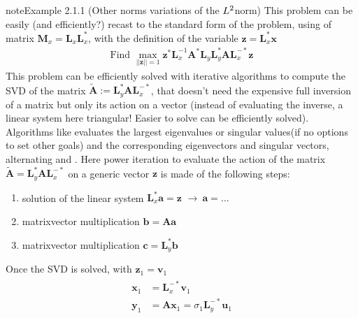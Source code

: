 \documentclass[letterpaper,10pt,english]{jupyterBook}
\begin{document}
\begin{sphinxadmonition}{note}{Example 2.1.1 (Other norms \sphinxhyphen{} variations of the \protect\(L^2\protect\)\sphinxhyphen{}norm)}
\sphinxAtStartPar
This problem can be easily (and efficiently?) recast to the standard form of the problem, using {\hyperref[\detokenize{ch/linear-algebra/matrix-factorization:math-matrix-factorization}]{}} of matrix \(\mathbf{M}_x = \mathbf{L}_x \mathbf{L}_x^*\), with the definition of the variable \(\mathbf{z} = \mathbf{L}_x^* \mathbf{x}\)
\begin{equation*}
\begin{split}\text{Find } \max_{||\mathbf{z}||=1} \mathbf{z}^* \mathbf{L}_x^{-1} \mathbf{A}^* \mathbf{L}_y \mathbf{L}_y^* \mathbf{A} \mathbf{L}_x^{-*} \mathbf{z} \end{split}
\end{equation*}
\sphinxAtStartPar
This problem can be efficiently solved with iterative algorithms to compute the SVD of the matrix \(\widetilde{\mathbf{A}} := \mathbf{L}_y^* \mathbf{A} \mathbf{L}_x^{-*}\), that doesn’t need the expensive full inversion of a matrix but only its action on a vector (instead of evaluating the inverse, a linear system \sphinxhyphen{} here triangular! Easier to solve \sphinxhyphen{} can be efficiently solved). Algorithms like  evaluates the largest eigenvalues or singular values(if no options to set other goals) and the corresponding eigenvectors and singular vectors, alternating  and . Here power iteration to evaluate the action of the matrix \(\widetilde{\mathbf{A}} = \mathbf{L}_y^* \mathbf{A}\mathbf{L}_x^{-*}\) on a generic vector \(\mathbf{z}\) is made of the following steps:
\begin{enumerate}
%
\item {} 
\sphinxAtStartPar
solution of the linear system \(\mathbf{L}^*_x \mathbf{a} = \mathbf{z}\) \(\rightarrow \ \mathbf{a} = \dots\)

\item {} 
\sphinxAtStartPar
matrix\sphinxhyphen{}vector multiplication \(\mathbf{b} = \mathbf{A} \mathbf{a}\)

\item {} 
\sphinxAtStartPar
matrix\sphinxhyphen{}vector multiplication \(\mathbf{c} = \mathbf{L}^*_y \mathbf{b}\)

\end{enumerate}

\sphinxAtStartPar
Once the SVD is solved, with \(\mathbf{z}_1 = \mathbf{v}_1\)
\begin{equation*}
\begin{split}\begin{aligned}
  \mathbf{x}_1 & = \mathbf{L}_x^{-*} \mathbf{v}_1 \\
  \mathbf{y}_1 & = \mathbf{A} \mathbf{x}_1 = \sigma_1 \mathbf{L}_y^{-*} \mathbf{u}_1 \\
\end{aligned}\end{split}
\end{equation*}\end{sphinxadmonition}
\end{document}
